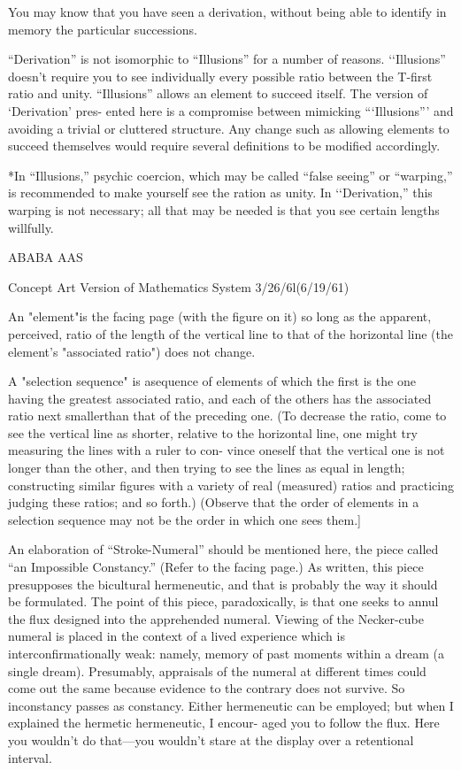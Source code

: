 You may know that you have seen a derivation, without being able to identify in memory the 
particular successions. 


“Derivation” is not isomorphic to “Illusions” for a number of reasons. ‘‘Illusions” doesn’t 
require you to see individually every possible ratio between the T-first ratio and unity. 
“Illusions” allows an element to succeed itself. The version of ‘Derivation’ pres- 
ented here is a compromise between mimicking “‘Illusions”’ and avoiding a trivial or 
cluttered structure. Any change such as allowing elements to succeed themselves 
would require several definitions to be modified accordingly. 


*In “Illusions,” psychic coercion, which may be called “false seeing” or “warping,” is 
recommended to make yourself see the ration as unity. In ‘‘Derivation,” this warping is not 
necessary; all that may be needed is that you see certain lengths willfully. 


ABABA AAS 


Concept Art Version of Mathematics System 3/26/6l(6/19/61) 

An "element"is the facing page (with the figure on it) so long 
as the apparent, perceived, ratio of the length of the vertical 
line to that of the horizontal line (the element’s "associated 
ratio") does not change. 

A "selection sequence" is asequence of elements of which the 
first is the one having the greatest associated ratio, and 
each of the others has the associated ratio next smallerthan 
that of the preceding one. (To decrease the ratio, come to 
see the vertical line as shorter, relative to the horizontal 
line, one might try measuring the lines with a ruler to con- 
vince oneself that the vertical one is not longer than the 
other, and then trying to see the lines as equal in length; 
constructing similar figures with a variety of real (measured) 
ratios and practicing judging these ratios; and so forth.) 
(Observe that the order of elements in a selection sequence 
may not be the order in which one sees them.] 


An elaboration of “Stroke-Numeral” should be mentioned here, 
the piece called “an Impossible Constancy.” (Refer to the facing page.) 
As written, this piece presupposes the bicultural hermeneutic, and that 
is probably the way it should be formulated. The point of this piece, 
paradoxically, is that one seeks to annul the flux designed into the 
apprehended numeral. Viewing of the Necker-cube numeral is placed 
in the context of a lived experience which is interconfirmationally 
weak: namely, memory of past moments within a dream (a single 
dream). Presumably, appraisals of the numeral at different times could 
come out the same because evidence to the contrary does not survive. 
So inconstancy passes as constancy. Either hermeneutic can be 
employed; but when I explained the hermetic hermeneutic, I encour- 
aged you to follow the flux. Here you wouldn’t do that—you wouldn't 
stare at the display over a retentional interval. 


